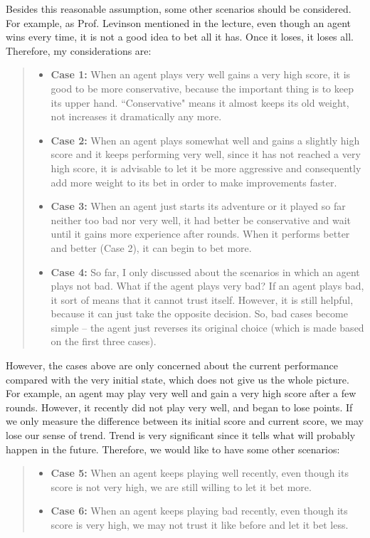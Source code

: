 \documentclass[10pt]{article}
\begin{document}
Besides this reasonable assumption, some other scenarios should be considered. For example, as Prof. Levinson mentioned in the lecture, even though an agent wins every time, it is not a good idea to bet all it has. Once it loses, it loses all. Therefore, my considerations are:
\begin{quote}
\begin{itemize}
\item \textbf{Case 1:} When an agent plays very well gains a very high score, it is good to be more conservative, because the important thing is to keep its upper hand. ``Conservative" means it almost keeps its old weight, not increases it dramatically any more.
\item \textbf{Case 2:} When an agent plays somewhat well and gains a slightly high score and it keeps performing very well, since it has not reached a very high score, it is advisable to let it be more aggressive and consequently add more weight to its bet in order to make improvements faster.
\item \textbf{Case 3:} When an agent just starts its adventure or it played so far neither too bad nor very well, it had better be conservative and wait until it gains more experience after rounds. When it performs better and better (Case 2), it can begin to bet more.
\item \textbf{Case 4:} So far, I only discussed about the scenarios in which an agent plays not bad. What if the agent plays very bad? If an agent plays bad, it sort of means that it cannot trust itself. However, it is still helpful, because it can just take the opposite decision. So, bad cases become simple -- the agent just reverses its original choice (which is made based on the first three cases).
\end{itemize}
\end{quote}

However, the cases above are only concerned about the current performance compared with the very initial state, which does not give us the whole picture. For example, an agent may play very well and gain a very high score after a few rounds. However, it recently did not play very well, and began to lose points. If we only measure the difference between its initial score and current score, we may lose our sense of trend. Trend is very significant since it tells what will probably happen in the future. Therefore, we would like to have some other scenarios:
\begin{quote}
\begin{itemize}
\item \textbf{Case 5:} When an agent keeps playing well recently, even though its score is not very high, we are still willing to let it bet more.
\item \textbf{Case 6:} When an agent keeps playing bad recently, even though its score is very high, we may not trust it like before and let it bet less.
\end{itemize}
\end{quote}
\end{document}
